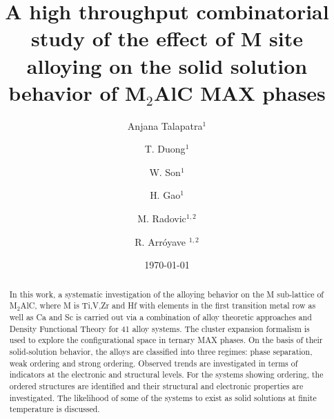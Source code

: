 \documentclass[preprint,amsmath,amssymb,aps, prb,showkeys]{revtex4-1}
\begin{document}

	\title{A high throughput combinatorial study of the effect of M site alloying on the solid solution behavior of M\texorpdfstring{$_2$}{}AlC MAX phases}
	\author{Anjana Talapatra$^{1}$}
	\author{T. Duong$^{1}$}
	\author{W. Son$^{1}$}
	\author{H. Gao$^{1}$}
	\author{M. Radovic$^{1,2}$}
	\author{R. Arr\'{o}yave $^{1,2}$}
	\date{\today}

	\begin{abstract}
		In this work, a systematic investigation of the alloying behavior on the M sub-lattice of M$_2$AlC, where M is Ti,V,Zr and Hf with elements in the first transition metal row as well as Ca and Sc is carried out via a combination of alloy theoretic approaches and Density Functional Theory for 41 alloy systems. The cluster expansion formalism is used to explore the configurational space in ternary MAX phases. On the basis of their solid-solution behavior, the alloys are classified into three regimes: phase separation, weak ordering and strong ordering. Observed trends are investigated in terms of indicators at the electronic and structural levels. For the systems showing ordering, the ordered structures are identified and their structural 
and electronic properties are investigated. The likelihood of some of the systems to exist as solid solutions at finite temperature is discussed.
	\end{abstract}


	\maketitle

\end{document}
